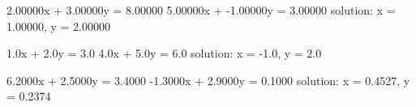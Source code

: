 \resett
\nextt
\begin{console}[commandchars=\\\{\}]
2.00000x + 3.00000y = 8.00000
5.00000x + -1.00000y = 3.00000
solution: x = 1.00000, y = 2.00000
\end{console}

\nextt
\begin{console}[commandchars=\\\{\}]
1.0x + 2.0y = 3.0
4.0x + 5.0y = 6.0
solution: x = -1.0, y = 2.0
\end{console}

\nextt
\begin{console}[commandchars=\\\{\}]
6.2000x + 2.5000y = 3.4000
-1.3000x + 2.9000y = 0.1000
solution: x = 0.4527, y = 0.2374
\end{console}
